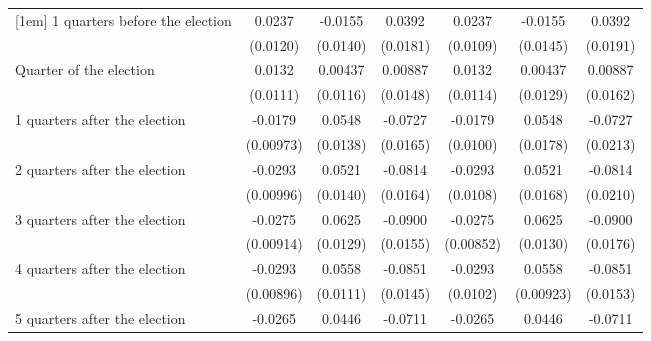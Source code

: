 \begin{table}[htbp]
\begin{tabular}{l*{6}{c}}
[1em]
 1 quarters before the election&      0.0237\sym{*}  &     -0.0155         &      0.0392\sym{*}  &      0.0237\sym{*}  &     -0.0155         &      0.0392\sym{*}  \\
                    &    (0.0120)         &    (0.0140)         &    (0.0181)         &    (0.0109)         &    (0.0145)         &    (0.0191)         \\
[1em]
Quarter of the election&      0.0132         &     0.00437         &     0.00887         &      0.0132         &     0.00437         &     0.00887         \\
                    &    (0.0111)         &    (0.0116)         &    (0.0148)         &    (0.0114)         &    (0.0129)         &    (0.0162)         \\
[1em]
 1 quarters after the election&     -0.0179         &      0.0548\sym{***}&     -0.0727\sym{***}&     -0.0179         &      0.0548\sym{**} &     -0.0727\sym{***}\\
                    &   (0.00973)         &    (0.0138)         &    (0.0165)         &    (0.0100)         &    (0.0178)         &    (0.0213)         \\
[1em]
 2 quarters after the election&     -0.0293\sym{**} &      0.0521\sym{***}&     -0.0814\sym{***}&     -0.0293\sym{**} &      0.0521\sym{**} &     -0.0814\sym{***}\\
                    &   (0.00996)         &    (0.0140)         &    (0.0164)         &    (0.0108)         &    (0.0168)         &    (0.0210)         \\
[1em]
 3 quarters after the election&     -0.0275\sym{**} &      0.0625\sym{***}&     -0.0900\sym{***}&     -0.0275\sym{**} &      0.0625\sym{***}&     -0.0900\sym{***}\\
                    &   (0.00914)         &    (0.0129)         &    (0.0155)         &   (0.00852)         &    (0.0130)         &    (0.0176)         \\
[1em]
 4 quarters after the election&     -0.0293\sym{**} &      0.0558\sym{***}&     -0.0851\sym{***}&     -0.0293\sym{**} &      0.0558\sym{***}&     -0.0851\sym{***}\\
                    &   (0.00896)         &    (0.0111)         &    (0.0145)         &    (0.0102)         &   (0.00923)         &    (0.0153)         \\
[1em]
 5 quarters after the election&     -0.0265\sym{**} &      0.0446\sym{***}&     -0.0711\sym{***}&     -0.0265\sym{*}  &      0.0446\sym{**} &     -0.0711\sym{***}\\

\end{tabular}
\end{table}
